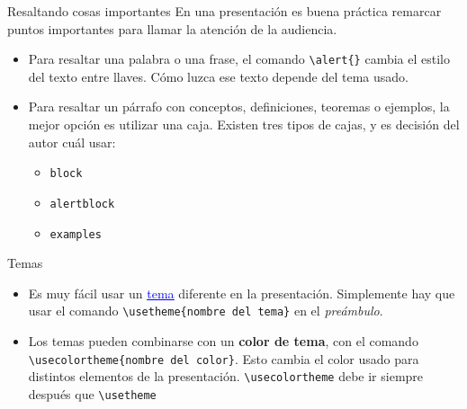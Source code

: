 \documentclass{beamer}
\begin{document}
    \begin{frame}[fragile]{Resaltando cosas importantes}
        \justifying
        En una presentación es \alert{buena práctica} remarcar puntos importantes para llamar
        la \alert{atención} de la audiencia.
        \begin{itemize}
            \justifying
            \item Para resaltar una palabra o una frase, el comando {\color{mygreen}\verb|\alert{}|} cambia
            el estilo del texto entre llaves. Cómo luzca ese texto depende del tema usado.
            \item Para resaltar un párrafo con conceptos, definiciones, teoremas o ejemplos, la mejor opción
            es utilizar una caja. Existen tres tipos de cajas, y es decisión del autor cuál usar:
            \begin{itemize}
                \item \verb|block|
                \item \verb|alertblock|
                \item \verb|examples|
            \end{itemize}
        \end{itemize}
    \end{frame}

    \begin{frame}[fragile]{Temas}
        \begin{itemize}
            \justifying
            \item Es muy fácil usar un \href{https://hartwork.org/beamer-theme-matrix/}{\textcolor{blue}{\underline{tema}}} diferente en la presentación. Simplemente hay que usar el comando
            {\color{mygreen}\verb|\usetheme{|}\verb|nombre del tema|{\color{mygreen}\verb|}|} en el
            \textsl{preámbulo}.
            \item Los temas pueden combinarse con un \textbf{color de tema}, con el comando {\color{mygreen}\verb|\usecolortheme{|}\verb|nombre del color|{\color{mygreen}\verb|}|}.
            Esto cambia el color usado para distintos elementos de la presentación. {\color{mygreen}\verb|\usecolortheme|} debe ir
            siempre después que  {\color{mygreen}\verb|\usetheme|}
        \end{itemize}
    \end{frame}    
\end{document}
